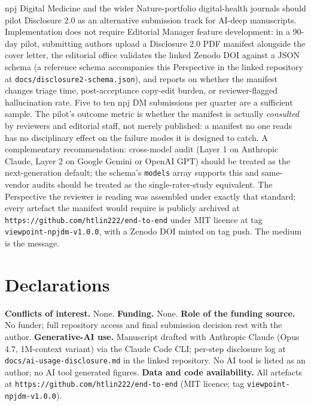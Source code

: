 \documentclass[11pt,a4paper]{article}
\begin{document}
npj Digital Medicine and the wider Nature-portfolio digital-health journals should pilot Disclosure 2.0 as an alternative submission track for AI-deep manuscripts. Implementation does not require Editorial Manager feature development: in a 90-day pilot, submitting authors upload a Disclosure 2.0 PDF manifest alongside the cover letter, the editorial office validates the linked Zenodo DOI against a JSON schema (a reference schema accompanies this Perspective in the linked repository at \texttt{docs/disclosure2-schema.json}), and reports on whether the manifest changes triage time, post-acceptance copy-edit burden, or reviewer-flagged hallucination rate. Five to ten npj DM submissions per quarter are a sufficient sample. The pilot's outcome metric is whether the manifest is actually \emph{consulted} by reviewers and editorial staff, not merely published: a manifest no one reads has no disciplinary effect on the failure modes it is designed to catch. A complementary recommendation: cross-model audit (Layer 1 on Anthropic Claude, Layer 2 on Google Gemini or OpenAI GPT) should be treated as the next-generation default; the schema's \texttt{models} array supports this and same-vendor audits should be treated as the single-rater-study equivalent. The Perspective the reviewer is reading was assembled under exactly that standard; every artefact the manifest would require is publicly archived at \texttt{https://github.com/htlin222/end-to-end} under MIT licence at tag \texttt{viewpoint-npjdm-v1.0.0}, with a Zenodo DOI minted on tag push. The medium is the message.

\section*{Declarations}
\noindent\textbf{Conflicts of interest.} None. \textbf{Funding.} None. \textbf{Role of the funding source.} No funder; full repository access and final submission decision rest with the author. \textbf{Generative-AI use.} Manuscript drafted with Anthropic Claude (Opus 4.7, 1M-context variant) via the Claude Code CLI; per-step disclosure log at \texttt{docs/ai-usage-disclosure.md} in the linked repository. No AI tool is listed as an author; no AI tool generated figures. \textbf{Data and code availability.} All artefacts at \texttt{https://github.com/htlin222/end-to-end} (MIT licence; tag \texttt{viewpoint-npjdm-v1.0.0}).



\end{document}
